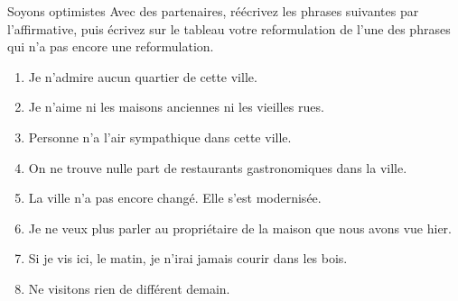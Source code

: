 \begin{frame}{Soyons optimistes}
  Avec des partenaires, réécrivez les phrases suivantes par l'affirmative, puis \alert{écrivez sur le tableau} votre reformulation de l'une des phrases qui n'a pas encore une reformulation.
  \begin{enumerate}
    \item Je n'admire aucun quartier de cette ville.
    \item Je n'aime ni les maisons anciennes ni les vieilles rues.
    \item Personne n'a l'air sympathique dans cette ville.
    \item On ne trouve nulle part de restaurants gastronomiques dans la ville.
    \item La ville n'a pas encore changé. Elle s'est modernisée.
    \item Je ne veux plus parler au propriétaire de la maison que nous avons vue hier.
    \item Si je vis ici, le matin, je n'irai jamais courir dans les bois.
    \item Ne visitons rien de différent demain.
  \end{enumerate}
\end{frame}